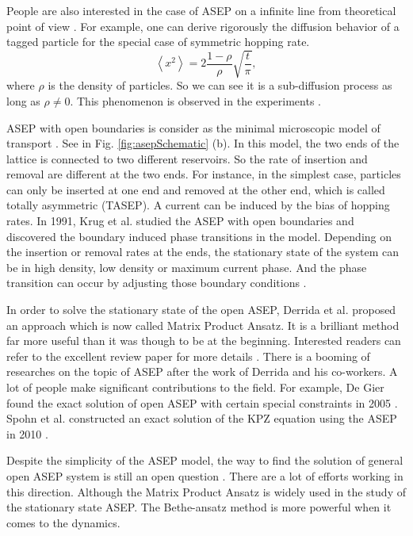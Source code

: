 People are also interested in the case of ASEP on a infinite line from theoretical point of view \cite{Levitt1973,Barkai2010a,Chou2011}. For example, one can derive rigorously the diffusion behavior of a tagged particle for the special case of symmetric hopping rate. 
\begin{equation}
    \label{eq:diffusionInfASEP}
    \left< x^2 \right> = 2 \frac{1-\rho}{\rho}\sqrt{\frac{t}{\pi}},
\end{equation}
where $\rho$ is the density of particles. So we can see it is a sub-diffusion process as long as $\rho\neq 0$. This phenomenon is observed in the experiments \cite{Chou2011}.

ASEP with open boundaries is consider as the minimal microscopic model of transport \cite{Crampe2014b, Mallick2011b}. See in Fig. \ref{fig:asepSchematic} (b). In this model, the two ends of the lattice is connected to two different reservoirs. So the rate of insertion and removal are different at the two ends. For instance, in the simplest case, particles can only be inserted at one end and removed at the other end, which is called totally asymmetric (TASEP). A current can be induced by the bias of hopping rates. In 1991, Krug et al. studied the ASEP with open boundaries and discovered the boundary induced phase transitions in the model. Depending on the insertion or removal rates at the ends, the stationary state of the system can be in high density, low density or maximum current phase. And the phase transition can occur by adjusting those boundary conditions \cite{Krug1991}. 

In order to solve the stationary state of the open ASEP, Derrida et al. proposed an approach which is now called Matrix Product Ansatz. It is a brilliant method far more useful than it was though to be at the beginning. Interested readers can refer to the excellent review paper for more details \cite{Derrida1998}. There is a booming of researches on the topic of ASEP after the work of Derrida and his co-workers. A lot of people make significant contributions to the field. For example, De Gier found the exact solution of open ASEP with certain special constraints in 2005 \cite{DeGier2005}. Spohn et al. constructed an exact solution of the KPZ equation using the ASEP in 2010 \cite{Sasamoto2010}. 

Despite the simplicity of the ASEP model, the way to find the solution of general open ASEP system is still an open question \cite{Crampe2014b, Mallick2011b}. There are a lot of efforts working in this direction. Although the Matrix Product Ansatz is widely used in the study of the stationary state ASEP. The Bethe-ansatz method is more powerful when it comes to the dynamics. 

